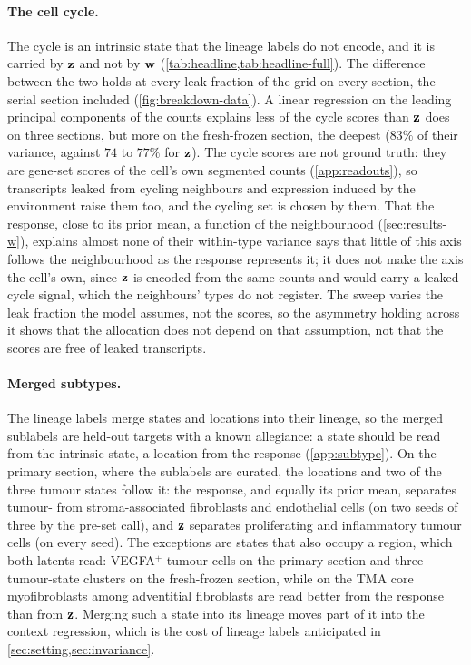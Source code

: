 \paragraph{The cell cycle.}
The cycle is an intrinsic state that the lineage labels do not encode, and it is carried by $\mathbf{z}$ and not by $\mathbf{w}$ (\cref{tab:headline,tab:headline-full}). The difference between the two holds at every leak fraction of the grid on every section, the serial section included (\cref{fig:breakdown-data}). A linear regression on the leading principal components of the counts explains less of the cycle scores than $\mathbf{z}$ does on three sections, but more on the fresh-frozen section, the deepest ($83\%$ of their variance, against $74$ to $77\%$ for $\mathbf{z}$). The cycle scores are not ground truth: they are gene-set scores of the cell's own segmented counts (\cref{app:readouts}), so transcripts leaked from cycling neighbours and expression induced by the environment raise them too, and the cycling set is chosen by them. That the response, close to its prior mean, a function of the neighbourhood (\cref{sec:results-w}), explains almost none of their within-type variance says that little of this axis follows the neighbourhood as the response represents it; it does not make the axis the cell's own, since $\mathbf{z}$ is encoded from the same counts and would carry a leaked cycle signal, which the neighbours' types do not register. The sweep varies the leak fraction the model assumes, not the scores, so the asymmetry holding across it shows that the allocation does not depend on that assumption, not that the scores are free of leaked transcripts.

\paragraph{Merged subtypes.}
The lineage labels merge states and locations into their lineage, so the merged sublabels are held-out targets with a known allegiance: a state should be read from the intrinsic state, a location from the response (\cref{app:subtype}). On the primary section, where the sublabels are curated, the locations and two of the three tumour states follow it: the response, and equally its prior mean, separates tumour- from stroma-associated fibroblasts and endothelial cells (on two seeds of three by the pre-set call), and $\mathbf{z}$ separates proliferating and inflammatory tumour cells (on every seed). The exceptions are states that also occupy a region, which both latents read: VEGFA$^+$ tumour cells on the primary section and three tumour-state clusters on the fresh-frozen section, while on the TMA core myofibroblasts among adventitial fibroblasts are read better from the response than from $\mathbf{z}$. Merging such a state into its lineage moves part of it into the context regression, which is the cost of lineage labels anticipated in \cref{sec:setting,sec:invariance}.

